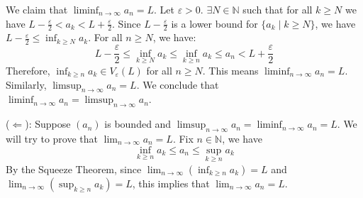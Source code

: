 \begin{solution}
\begin{itemize}
              We claim that $\liminf_{n \to \infty} a_n = L$. Let $\varepsilon > 0$. $\exists N \in \mathbb{N}$ such
              that for all $k \ge N$ we have $L - \frac{\varepsilon}{2} < a_k < L + \frac{\varepsilon}{2}$.
              Since $L - \frac{\varepsilon}{2}$ is a lower bound for $\{a_k \mid k \ge N\}$,
              we have $L - \frac{\varepsilon}{2} \le \inf_{k \ge N} a_k$. For all $n \ge N$, we have:
              \[
                  L - \frac{\varepsilon}{2} \le \inf_{k \ge N} a_k \le \inf_{k \ge n} a_k \le a_n < L + \frac{\varepsilon}{2}
              \]
              Therefore, $\inf_{k \ge n} a_k \in V_\varepsilon(L)$ for all $n \ge N$. This means $\liminf_{n \to \infty} a_n = L$.
              Similarly, $\limsup_{n \to \infty} a_n = L$. We conclude that $\liminf_{n \to \infty}
                  a_n = \limsup_{n \to \infty} a_n$.

              ($\Leftarrow$): Suppose $(a_n)$ is bounded and $\limsup_{n \to \infty} a_n = \liminf_{n \to \infty} a_n = L$. 
              We will try to prove that $\lim_{n \to \infty} a_n = L$. Fix $n \in \mathbb{N}$, we have
              \[
                  \inf_{k \ge n} a_k \le a_n \le \sup_{k \ge n} a_k
              \]
              By the Squeeze Theorem, since $\lim_{n \to \infty} (\inf_{k \ge n} a_k) =
               L$ and $\lim_{n \to \infty} (\sup_{k \ge n} a_k) = L$, this implies that $\lim_{n \to \infty} a_n = L$.

    \end{itemize}
\end{solution}